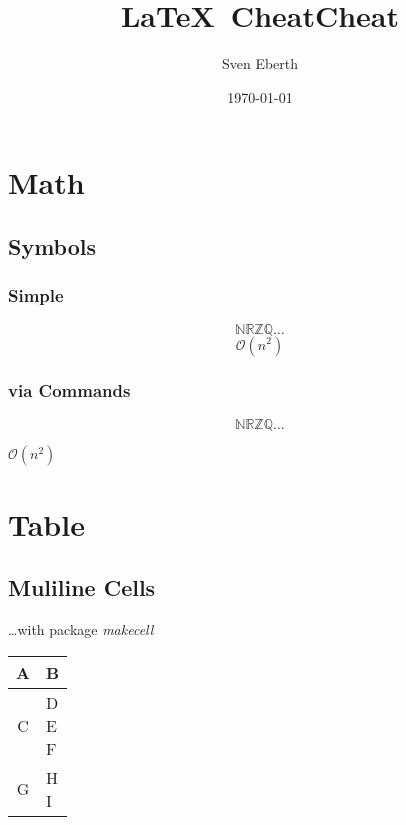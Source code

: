 \documentclass[11pt]{article}
\title{\LaTeX~CheatCheat}
\author{Sven Eberth}
\date{\today}
\begin{document}
    \maketitle
    \tableofcontents
    \newpage


    \section{Math}\label{sec:math}
		\subsection{Symbols}
			\subsubsection{Simple}
		    \[ \mathbb{N R Z Q} \ldots \]
		    \[ \mathcal{O}(n^2) \]
		
		    \subsubsection{via Commands}
		    \newcommand{\N}[0]{\mathbb{N}}
		    \newcommand{\R}[0]{\mathbb{R}}
		    \newcommand{\Z}[0]{\mathbb{Z}}
		    \newcommand{\Q}[0]{\mathbb{Q}}
		    
		    \newcommand{\bigO}[1]{$\mathcal{O}(#1)$}
		
		    \[ \N \R \Z \Q \ldots \]
		    \begin{center}
			    	\bigO{n^2}
			\end{center}


    \section{Table}\label{sec:table}
		\subsection{Muliline Cells}
		\ldots with package \textit{makecell}
		
		\begin{tabular}{cl}
			A		& B  \\
			\hline
			C		& \makecell[tl]{D \\ E \\ F} \\
			\hline
			G		& \makecell[tr]{H \\ I}
	    \end{tabular}
    
\end{document}
